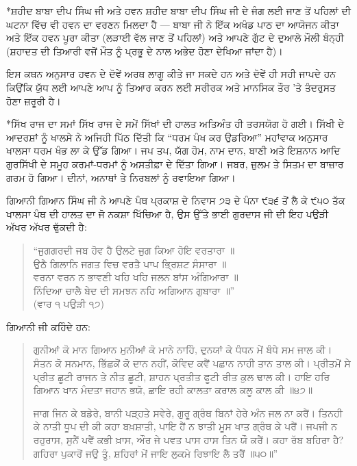 \documentclass[12pt,a5paper,twoside]{book}  %
\makeatletter
\renewcommand\section{\@startsection{section}{1}{0pt}{1.2em}{0.6em}{\punjabifont\Large\bfseries}}%
\makeatother
\begin{document}
{\section*{ਸ਼ਹੀਦ ਬਾਬਾ ਦੀਪ ਸਿੰਘ ਜੀ ਅਤੇ ਹਵਨ}
ਸ਼ਹੀਦ ਬਾਬਾ ਦੀਪ ਸਿੰਘ ਜੀ ਦੇ ਜੰਗ ਲਈ ਜਾਣ ਤੋਂ ਪਹਿਲਾਂ ਦੀ ਘਟਨਾ ਵਿੱਚ ਵੀ ਹਵਨ ਦਾ ਵਰਣਨ ਮਿਲਦਾ ਹੈ — ਬਾਬਾ ਜੀ ਨੇ ਇੱਕ ਅਖੰਡ ਪਾਠ ਦਾ ਆਯੋਜਨ ਕੀਤਾ ਅਤੇ ਇੱਕ ਹਵਨ ਪੂਰਾ ਕੀਤਾ (ਲੜਾਈ ਵੱਲ ਜਾਣ ਤੋਂ ਪਹਿਲਾਂ) ਅਤੇ ਆਪਣੇ ਗੁੱਟ ਦੇ ਦੁਆਲੇ ਮੌਲੀ ਬੰਨ੍ਹੀ (ਸ਼ਹਾਦਤ ਦੀ ਤਿਆਰੀ ਵਜੋਂ ਮੌਤ ਨੂੰ ਪ੍ਰਭੂ ਦੇ ਨਾਲ ਅਭੇਦ ਹੋਣਾ ਦੇਖਿਆ ਜਾਂਦਾ ਹੈ)।

ਇਸ ਕਥਨ ਅਨੁਸਾਰ ਹਵਨ ਦੇ ਦੋਵੇਂ ਅਰਥ ਲਾਗੂ ਕੀਤੇ ਜਾ ਸਕਦੇ ਹਨ ਅਤੇ ਦੋਵੇਂ ਹੀ ਸਹੀ ਜਾਪਦੇ ਹਨ ਕਿਉਂਕਿ ਯੁੱਧ ਲਈ ਆਪਣੇ ਆਪ ਨੂੰ ਤਿਆਰ ਕਰਨ ਲਈ ਸਰੀਰਕ ਅਤੇ ਮਾਨਸਿਕ ਤੌਰ 'ਤੇ ਤੰਦਰੁਸਤ ਹੋਣਾ ਜ਼ਰੂਰੀ ਹੈ।

\section*{ਸਿੱਖ ਰਾਜ ਦਾ ਸਮਾਂ}
ਸਿੱਖ ਰਾਜ ਦੇ ਸਮੇਂ ਸਿੱਖਾਂ ਦੀ ਹਾਲਤ ਅਤਿਅੰਤ ਹੀ ਤਰਸਯੋਗ ਹੋ ਗਈ। ਸਿੱਖੀ ਦੇ ਆਦਰਸ਼ਾਂ ਨੂੰ ਖਾਲਸੇ ਨੇ ਅਜਿਹੀ ਪਿੱਠ ਦਿੱਤੀ ਕਿ “ਧਰਮ ਪੰਖ ਕਰ ਉਡਰਿਆ” ਮਹਾਂਵਾਕ ਅਨੁਸਾਰ ਖਾਲਸਾ ਧਰਮ ਖੰਭ ਲਾ ਕੇ ਉੱਡ ਗਿਆ। ਜਪ ਤਪ, ਯੱਗ ਹੋਮ, ਨਾਮ ਦਾਨ, ਬਾਣੀ ਅਤੇ ਇਸ਼ਨਾਨ ਆਦਿ ਗੁਰਸਿੱਖੀ ਦੇ ਸਮੂਹ ਕਰਮਾਂ-ਧਰਮਾਂ ਨੂੰ ਅਸਤੀਫ਼ਾ ਦੇ ਦਿੱਤਾ ਗਿਆ। ਜਬਰ, ਜ਼ੁਲਮ ਤੇ ਸਿਤਮ ਦਾ ਬਾਜ਼ਾਰ ਗਰਮ ਹੋ ਗਿਆ। ਦੀਨਾਂ, ਅਨਾਥਾਂ ਤੇ ਨਿਰਬਲਾਂ ਨੂੰ ਰਵਾਇਆ ਗਿਆ।

ਗਿਆਨੀ ਗਿਆਨ ਸਿੰਘ ਜੀ ਨੇ ਆਪਣੇ ਪੰਥ ਪ੍ਰਕਾਸ਼ ਦੇ ਨਿਵਾਸ ੭੩ ਦੇ ਪੰਨਾ ੯੩੬ ਤੋਂ ਲੈ ਕੇ ੯੫੦ ਤੱਕ ਖਾਲਸਾ ਪੰਥ ਦੀ ਹਾਲਤ ਦਾ ਜੋ ਨਕਸ਼ਾ ਖਿੱਚਿਆ ਹੈ, ਉਸ ਉੱਤੇ ਭਾਈ ਗੁਰਦਾਸ ਜੀ ਦੀ ਇਹ ਪਉੜੀ ਅੱਖਰ ਅੱਖਰ ਢੁੱਕਦੀ ਹੈ:
\begin{quote}
“ਜੁਗਗਰਦੀ ਜਬ ਹੋਵ ਹੈ ਉਲਟੇ ਜੁਗ ਕਿਆ ਹੋਇ ਵਰਤਾਰਾ ॥ \\
ਉਠੈ ਗਿਲਾਨਿ ਜਗਤ ਵਿਚ ਵਰਤੈ ਪਾਪ ਭ੍ਰਿਸ਼ਟ ਸੰਸਾਰਾ ॥ \\
ਵਰਨਾ ਵਰਨ ਨ ਭਾਵਣੀ ਖਹਿ ਖਹਿ ਜਲਨ ਬਾਂਸ ਅੰਗਿਆਰਾ ॥ \\
ਨਿੰਦਿਆ ਚਾਲੈ ਬੇਦ ਦੀ ਸਮਝਨ ਨਹਿ ਅਗਿਆਨ ਗੁਬਾਰਾ ॥” \\
(ਵਾਰ ੧ ਪਉੜੀ ੧੭)
\end{quote}
ਗਿਆਨੀ ਜੀ ਕਹਿੰਦੇ ਹਨ:
\begin{quote}
ਗੁਨੀਆਂ ਕੋ ਮਾਨ ਗਿਆਨ ਮੁਨੀਆਂ ਕੋ ਮਾਨੇ ਨਾਹਿੰ, ਦੁਨਯਾਂ ਕੇ ਧੰਧਨ ਮੇਂ ਬੰਧੇ ਸਮ ਜਾਲ ਕੀ। ਸੰਤਨ ਕੋ ਸਨਮਾਨ, ਭਿੱਛਕੋਂ ਕੋ ਦਾਨ ਨਹੀਂ, ਕੋਵਿਦ ਕਵੈਂ ਪਛਾਨ ਨਾਹੀ ਤਾਨ ਤਾਲ ਕੀ। ਪ੍ਰੀਤਮੋਂ ਸੇ ਪ੍ਰੀਤ ਛੂਟੀ ਰਾਜਨ ਤੇ ਨੀਤ ਛੂਟੀ, ਸ਼ਾਹਨ ਪ੍ਰਤੀਤ ਫੂਟੀ ਰੀਤ ਕੁਲ ਢਾਲ ਕੀ। ਹਾਇ ਹਰਿ ਗਿਆਨ ਖਾਨ ਮੰਦਤਾ ਜਹਾਨ ਭਯੋ, ਛਾਇ ਰਹੀ ਕਾਲਤਾ ਕਰਾਲ ਕਲੂ ਕਾਲ ਕੀ ॥੪੭॥

ਜਾਗ ਜਿਨ ਕੇ ਬਡੇਰੇ, ਬਾਨੀ ਪੜ੍ਹਤੇ ਸਵੇਰੇ, ਗੁਰੂ ਗ੍ਰੰਥ ਬਿਨਾਂ ਹੇਰੇ ਅੰਨ ਜਲ ਨਾ ਕਰੈਂ। ਤਿਨਹੀ ਕੇ ਨਾਤੀ ਧੂਪ ਦੀ ਕੀ ਕਹਾ ਬਖ਼ਸ਼ਾਤੀ, ਪਾਇ ਹੈਂ ਨ ਝਾਤੀ ਮੂਸ ਖਾਤ ਗ੍ਰੰਥ ਕੇ ਪਰੈਂ। ਜਪਜੀ ਨ ਰਹੁਰਾਸ, ਸੁਨੈਂ ਪਵੈਂ ਕਭੀ ਖ਼ਾਸ, ਔਰ ਜੇ ਪਵਤ ਪਾਸ ਹਾਸ ਤਿਨ ਯੌ ਕਰੈਂ। ਕਹਾ ਰੱਬ ਬਹਿਰਾ ਹੈ? ਗਹਿਰਾ ਪੁਕਾਰੋਂ ਜਉ ਤੂੰ, ਸ਼ਹਿਰਾਂ ਮੇਂ ਜਾਇ ਲੁਕਮੇ ਰਿਝਾਇ ਲੈ ਤਰੈਂ ॥੫੦॥”
\end{quote}

}
\end{document}
